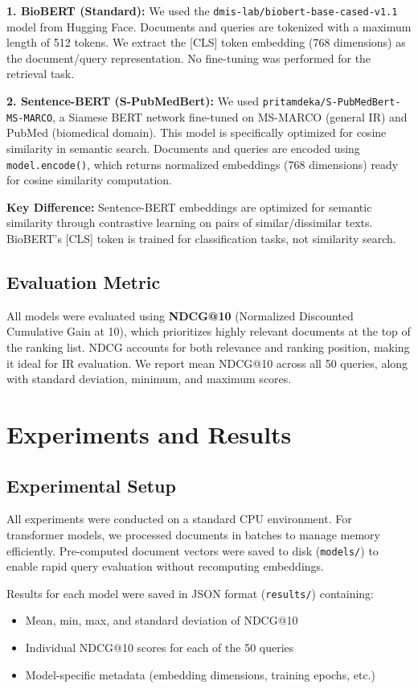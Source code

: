 \documentclass[sigconf,nonacm]{acmart}
\begin{document}
\textbf{1. BioBERT (Standard):} We used the \texttt{dmis-lab/biobert-base-cased-v1.1} model from Hugging Face. Documents and queries are tokenized with a maximum length of 512 tokens. We extract the [CLS] token embedding (768 dimensions) as the document/query representation. No fine-tuning was performed for the retrieval task.

\textbf{2. Sentence-BERT (S-PubMedBert):} We used \texttt{pritamdeka/S-PubMedBert-MS-MARCO}, a Siamese BERT network fine-tuned on MS-MARCO (general IR) and PubMed (biomedical domain). This model is specifically optimized for cosine similarity in semantic search. Documents and queries are encoded using \texttt{model.encode()}, which returns normalized embeddings (768 dimensions) ready for cosine similarity computation.

\textbf{Key Difference:} Sentence-BERT embeddings are optimized for semantic similarity through contrastive learning on pairs of similar/dissimilar texts. BioBERT's [CLS] token is trained for classification tasks, not similarity search.

\subsection{Evaluation Metric}
All models were evaluated using \textbf{NDCG@10} (Normalized Discounted Cumulative Gain at 10), which prioritizes highly relevant documents at the top of the ranking list. NDCG accounts for both relevance and ranking position, making it ideal for IR evaluation. We report mean NDCG@10 across all 50 queries, along with standard deviation, minimum, and maximum scores.

\section{Experiments and Results}

\subsection{Experimental Setup}
All experiments were conducted on a standard CPU environment. For transformer models, we processed documents in batches to manage memory efficiently. Pre-computed document vectors were saved to disk (\texttt{models/}) to enable rapid query evaluation without recomputing embeddings.

Results for each model were saved in JSON format (\texttt{results/}) containing:
\begin{itemize}
    \item Mean, min, max, and standard deviation of NDCG@10
    \item Individual NDCG@10 scores for each of the 50 queries
    \item Model-specific metadata (embedding dimensions, training epochs, etc.)
\end{itemize}
\end{document}
